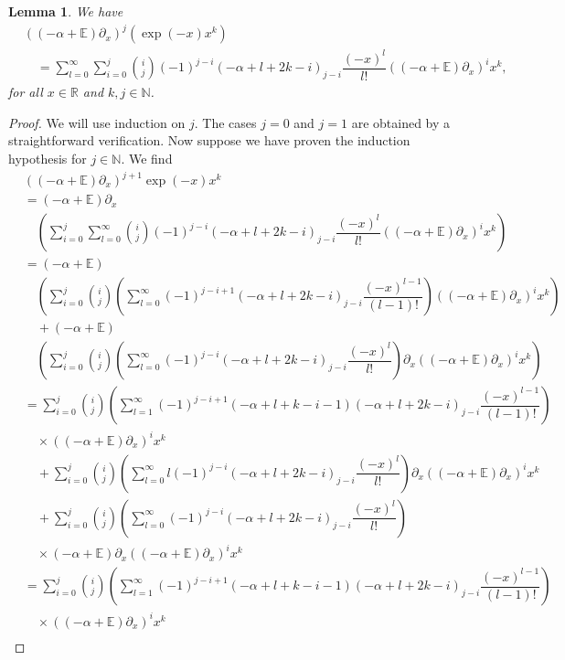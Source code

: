 \documentclass{amsart}
\newtheorem{lemma}[theorem]{Lemma}
\numberwithin{theorem}{section}
\theoremstyle{definition}
\theoremstyle{remark}
\def\R{\mathds{R} }
\def\E{\mathds{E} }
\def\N{\mathds{N} }
\newcommand{\pt}[1]{\partial_{#1}}
\newcommand{\ds}[1]{\mathds{#1}}
\begin{document}
\begin{lemma}\label{LemSum}
We have
\begin{align*}
&((-\alpha+\ds E)\pt x)^j \left( \exp(-x)x^k  \right)\\
&\quad = \sum_{l=0}^\infty\sum_{i=0}^j\binom{i}{j}(-1)^{j-i}(-\alpha+l+2k-i)_{j-i}\dfrac{(-x)^l}{l!}((-\alpha+\E)\pt x)^ix^k,
\end{align*}
for all $x\in \R$ and $k,j\in \N$.
\end{lemma}

\begin{proof}
We will use induction on $j$. The cases $j=0$  and $j=1$ are obtained by a straightforward verification. Now suppose we have proven the induction hypothesis for $j\in \ds N$. We find
\begin{align*}
&((-\alpha+\ds E)\pt x)^{j+1} \exp(-x)x^k\\
& = (-\alpha+\ds E)\pt x\\
&\quad \left(\sum_{i=0}^j\sum_{l=0}^\infty\binom{i}{j}(-1)^{j-i}(-\alpha+l+2k-i)_{j-i}\dfrac{(-x)^l}{l!}((-\alpha+\E)\pt x)^ix^k\right)\\
& = (-\alpha+\ds E)\\
&\quad \left(\sum_{i=0}^j\binom{i}{j}\left(\sum_{l=0}^\infty(-1)^{j-i+1}(-\alpha+l+2k-i)_{j-i}\dfrac{(-x)^{l-1}}{(l-1)!}\right)((-\alpha+\E)\pt x)^ix^k\right)\\
&\quad + (-\alpha+\ds E)\\
&\quad \left(\sum_{i=0}^j\binom{i}{j}\left(\sum_{l=0}^\infty(-1)^{j-i}(-\alpha+l+2k-i)_{j-i}\dfrac{(-x)^l}{l!}\right)\pt x((-\alpha+\E)\pt x)^ix^k\right)\\
& = \sum_{i=0}^j\binom{i}{j}\left(\sum_{l=1}^\infty(-1)^{j-i+1}(-\alpha+l+k-i-1)(-\alpha+l+2k-i)_{j-i}\dfrac{(-x)^{l-1}}{(l-1)!}\right)\\
&\quad \times ((-\alpha+\E)\pt x)^ix^k\\
&\quad + \sum_{i=0}^j\binom{i}{j}\left(\sum_{l=0}^\infty l(-1)^{j-i}(-\alpha+l+2k-i)_{j-i}\dfrac{(-x)^l}{l!}\right)\pt x((-\alpha+\E)\pt x)^ix^k\\
&\quad + \sum_{i=0}^j\binom{i}{j}\left(\sum_{l=0}^\infty(-1)^{j-i}(-\alpha+l+2k-i)_{j-i}\dfrac{(-x)^l}{l!}\right)\\
&\quad \times(-\alpha+\ds E)\pt x((-\alpha+\E)\pt x)^ix^k\\
& = \sum_{i=0}^j\binom{i}{j}\left(\sum_{l=1}^\infty(-1)^{j-i+1}(-\alpha+l+k-i-1)(-\alpha+l+2k-i)_{j-i}\dfrac{(-x)^{l-1}}{(l-1)!}\right)\\
&\quad \times ((-\alpha+\E)\pt x)^ix^k\\

\end{align*}
\end{proof}
\end{document}
